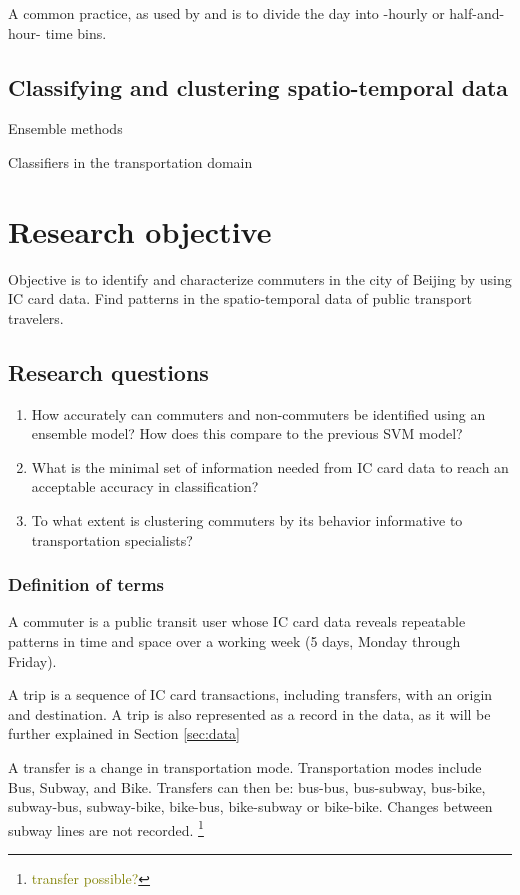 \documentclass{article}
\newcommand{\Liangdoubt}[1]{\footnote{\textcolor{olive}{#1}}}
\begin{document}
A common practice, as used by \cite{ma2017understanding} and \cite{langlois2016inferring} is to divide the day into -hourly or half-and-hour- time bins.

\subsection{Classifying and clustering spatio-temporal data}
Ensemble methods

Classifiers in the transportation domain


\newpage
\section{Research objective}
Objective is to identify and characterize commuters in the city of Beijing by using IC card data. Find patterns in the spatio-temporal data of public transport travelers. 

\subsection{Research questions}
\begin{enumerate}
\item How accurately can commuters and non-commuters be identified using an ensemble model? How does this compare to the previous SVM model?
\item What is the minimal set of information needed from IC card data to reach an acceptable accuracy in classification?
\item To what extent is clustering commuters by its behavior informative to transportation specialists? 
\end{enumerate}

\subsubsection{Definition of terms}
A commuter is a public transit user whose IC card data reveals repeatable patterns in time and space over a working week (5 days, Monday through Friday).

A trip is a sequence of IC card transactions, including transfers, with an origin and destination. A trip is also represented as a record in the data, as it will be further explained in Section \ref{sec:data}

A transfer is a change in transportation mode. Transportation modes include Bus, Subway, and Bike. Transfers can then be: bus-bus, bus-subway, bus-bike, subway-bus, subway-bike, bike-bus, bike-subway or bike-bike. Changes between subway lines are not recorded. \Liangdoubt{transfer possible?} 
\end{document}
